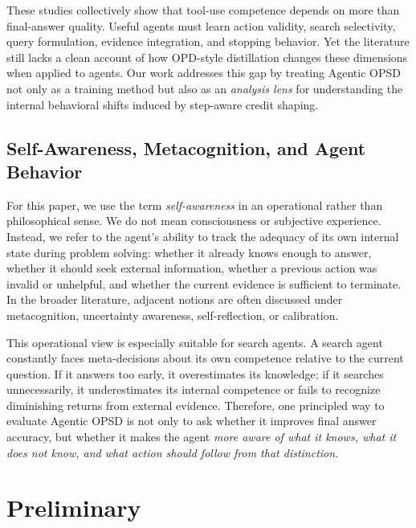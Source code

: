 \documentclass[11pt]{article}
\newcommand{\method}{Agentic OPSD}
\begin{document}
These studies collectively show that tool-use competence depends on more than final-answer quality. Useful agents must learn action validity, search selectivity, query formulation, evidence integration, and stopping behavior. Yet the literature still lacks a clean account of how OPD-style distillation changes these dimensions when applied to agents. Our work addresses this gap by treating \method{} not only as a training method but also as an \emph{analysis lens} for understanding the internal behavioral shifts induced by step-aware credit shaping.

\subsection{Self-Awareness, Metacognition, and Agent Behavior}
For this paper, we use the term \emph{self-awareness} in an operational rather than philosophical sense. We do not mean consciousness or subjective experience. Instead, we refer to the agent's ability to track the adequacy of its own internal state during problem solving: whether it already knows enough to answer, whether it should seek external information, whether a previous action was invalid or unhelpful, and whether the current evidence is sufficient to terminate. In the broader literature, adjacent notions are often discussed under metacognition, uncertainty awareness, self-reflection, or calibration.

This operational view is especially suitable for search agents. A search agent constantly faces meta-decisions about its own competence relative to the current question. If it answers too early, it overestimates its knowledge; if it searches unnecessarily, it underestimates its internal competence or fails to recognize diminishing returns from external evidence. Therefore, one principled way to evaluate \method{} is not only to ask whether it improves final answer accuracy, but whether it makes the agent \emph{more aware of what it knows, what it does not know, and what action should follow from that distinction}.

\section{Preliminary}
\end{document}
